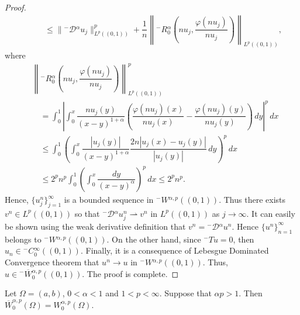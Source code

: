 \documentclass[leqno,final]{siamltex}
\numberwithin{equation}{section}
\renewcommand{\(}{\bigl(}
\renewcommand{\)}{\bigr)}
\begin{document}
\begin{proof}
\begin{align*}
            &\qquad \leq \|{^{-}}{\mathcal{D}}{^{\alpha}} u_j \|_{L^{p}((0,1))}^{p} + \dfrac{1}{n} \left\| {^{-}}{R}{^{\alpha}_{0}} \left(nu_j , \dfrac{\varphi(nu_j)}{nu_j}\right) \right\|_{L^{p}((0,1))},
        \end{align*}
        where 
        \begin{align*}
            &\left\| {^{-}}{R}{^{\alpha}_{0}} \left(nu_j , \dfrac{\varphi(nu_j)}{nu_j}\right) \right\|_{L^{p}((0,1))}^{p} \\
             &\quad =  \int_{0}^{1} \left| \int_{0}^{x} \dfrac{nu_j(y)}{(x-y)^{1+\alpha}} \left( \dfrac{\varphi(nu_j)(x)}{nu_j(x)} - \dfrac{\varphi(nu_j)(y)}{nu_j(y)} \right)\,dy \right|^{p}\,dx\\
            &\quad \leq  \int_{0}^{1} \left( \int_{0}^{x} \dfrac{|u_j(y)|}{(x-y)^{1+\alpha}} \dfrac{2n|u_j(x) - u_j(y)|}{|u_j(y)|}\,dy \right)^{p}\,dx \\
            &\quad \leq 2^p n^p \int_{0}^{1} \left( \int_{0}^{x} \dfrac{dy}{(x-y)^{\alpha}} \right)^{p}\,dx \leq 2^{p} n^{p}. 
        \end{align*}
        Hence, $\{u^{n}_{j}\}_{j=1}^{\infty}$ is a bounded sequence in ${^{-}}{W}{^{\alpha,p}}((0,1))$. Thus there exists $v^n \in L^{p}((0,1))$ so that ${^{-}}{\mathcal{D}}{^{\alpha}} u^n_j \rightharpoonup v^n$ in $L^{p}((0,1))$ as 
        $j\to \infty$. It can easily be shown using the weak derivative definition that $v^{n} = {^{-}}{\mathcal{D}}{^{\alpha}}u^{n}$. Hence $\{u^n\}_{n=1}^{\infty}$ belongs to ${^{-}}{W}{^{\alpha,p}}((0,1))$. On the other hand, since ${^{-}}{T}u = 0 $, 
        then $u_n \in {^{-}}{C}{^{\infty}_{0}}((0,1))$. Finally, it is a consequence of Lebesgue Dominated Convergence theorem that $u^n \rightarrow u$ in ${^{-}}{W}{^{\alpha,p}}((0,1))$. Thus, $u \in {^{-}}{\overline{W}}{^{\alpha,p}_{0}}((0,1))$. The proof is complete. 
    \end{proof}
    
   
    \begin{theorem}
          Let $\Omega=(a,b)$, $0 < \alpha <1$ and $1 < p <\infty$. Suppose that  $\alpha p >1$. Then $\overline{W}^{\alpha ,p}_{0}(\Omega)= W^{\alpha,p}_{0}(\Omega)$. 
    \end{theorem}
    
\end{document}

